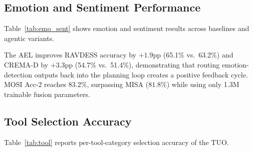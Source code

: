 \documentclass[10pt,conference]{IEEEtran}
\theoremstyle{ieeethm}
\theoremstyle{ieeedef}
\theoremstyle{ieeeremark}
\begin{document}
\subsection{Emotion and Sentiment Performance}

Table~\ref{tab:emo_sent} shows emotion and sentiment results across baselines and agentic variants.

\begin{table}[!t]
\centering
\caption{Emotion and Sentiment Results}
\label{tab:emo_sent}
\end{table}

The AEL improves RAVDESS accuracy by $+1.9$pp (65.1\% vs.\ 63.2\%) and CREMA-D by $+3.3$pp (54.7\% vs.\ 51.4\%), demonstrating that routing emotion-detection outputs back into the planning loop creates a positive feedback cycle. MOSI Acc-2 reaches $83.2\%$, surpassing MISA ($81.8\%$) while using only 1.3M trainable fusion parameters.

\subsection{Tool Selection Accuracy}

Table~\ref{tab:tool} reports per-tool-category selection accuracy of the TUO.
\end{document}
